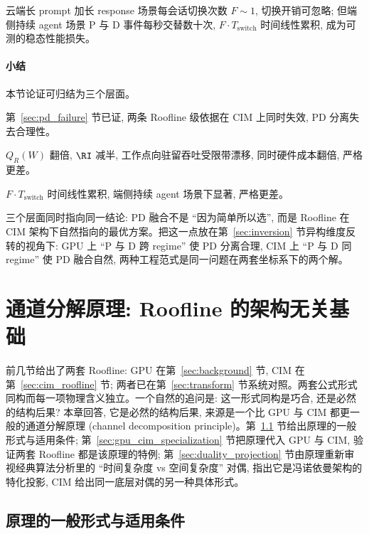 云端长 prompt 加长 response 场景每会话切换次数 $F \sim 1$, 切换开销可忽略; 但端侧持续 agent 场景 P 与 D 事件每秒交替数十次, $F \cdot T_{\text{switch}}$ 时间线性累积, 成为可测的稳态性能损失。

\paragraph{小结}
本节论证可归结为三个层面。

\begin{description}[leftmargin=*, itemsep=4pt]
    \item[\textbf{理论层 (依据)}:] 第~\ref{sec:pd_failure} 节已证, 两条 Roofline 级依据在 CIM 上同时失效, PD 分离失去合理性。
    \item[\textbf{工程层 (双硬件)}:] $Q_R(W)$ 翻倍, $\RI$ 减半, 工作点向驻留吞吐受限带漂移, 同时硬件成本翻倍, 严格更差。
    \item[\textbf{工程层 (模式切换)}:] $F \cdot T_{\text{switch}}$ 时间线性累积, 端侧持续 agent 场景下显著, 严格更差。
\end{description}

三个层面同时指向同一结论: PD 融合不是 “因为简单所以选”, 而是 Roofline 在 CIM 架构下自然指向的最优方案。把这一点放在第~\ref{sec:inversion} 节异构维度反转的视角下: GPU 上 “P 与 D 跨 regime” 使 PD 分离合理, CIM 上 “P 与 D 同 regime” 使 PD 融合自然, 两种工程范式是同一问题在两套坐标系下的两个解。
\newpage

\section{通道分解原理: Roofline 的架构无关基础}
\label{sec:channel_decomposition}

前几节给出了两套 Roofline: GPU 在第~\ref{sec:background} 节, CIM 在第~\ref{sec:cim_roofline} 节; 两者已在第~\ref{sec:transform} 节系统对照。两套公式形式同构而每一项物理含义独立。一个自然的追问是: 这一形式同构是巧合, 还是必然的结构后果? 本章回答, 它是必然的结构后果, 来源是一个比 GPU 与 CIM 都更一般的通道分解原理 (channel decomposition principle)。第~\ref{sec:principle_form} 节给出原理的一般形式与适用条件; 第~\ref{sec:gpu_cim_specialization} 节把原理代入 GPU 与 CIM, 验证两套 Roofline 都是该原理的特例; 第~\ref{sec:duality_projection} 节由原理重新审视经典算法分析里的 “时间复杂度 vs 空间复杂度” 对偶, 指出它是冯诺依曼架构的特化投影, CIM 给出同一底层对偶的另一种具体形式。

\subsection{原理的一般形式与适用条件}
\label{sec:principle_form}

